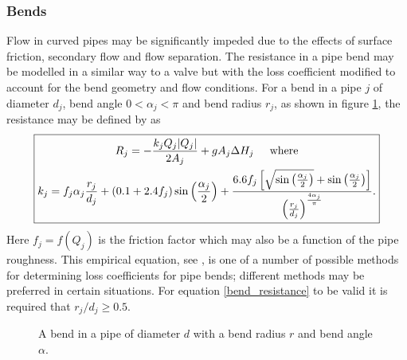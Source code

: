 \subsubsection{Bends} 

Flow in curved pipes may be significantly impeded due to the effects of surface friction, secondary flow and flow separation. The resistance in a pipe bend may be modelled in a similar way to a valve but with the loss coefficient modified to account for the bend geometry and flow conditions. For a bend in a pipe $j$ of diameter $d_j$, bend angle $0 < \alpha_j < \pi$ and bend radius $r_j$, as shown in figure \ref{fig:bend_diagram}, the resistance may be defined by as
\begin{align}\label{bend_resistance}
\boxed{
  \!\begin{gathered}
  R_j = - \frac{k_j Q_j|Q_j| }{2 A_j} + g A_j \Delta H_j \hspace{0.5cm} \text{where}\\
  k_j = f_j \alpha_j \frac{r_j}{d_j}	 + (0.1 + 2.4 f_j) \sin \left( \frac{\alpha_j}{2} \right) + \frac{6.6 f_j \left[ \sqrt{\sin \left( \frac{\alpha_j}{2} \right) } + \sin \left( \frac{\alpha_j}{2} \right)  \right] }{\left(\frac{r_j}{d_j} \right)^{\frac{4 \alpha_j}{\pi}}}.
  \end{gathered}
}
\end{align}
Here $f_j = f(Q_j)$ is the friction factor which may also be a function of the pipe roughness. This empirical equation, see \cite{rennels22}, is one of a number of possible methods for determining loss coefficients for pipe bends; different methods may be preferred in certain situations. For equation \eqref{bend_resistance} to be valid it is required that $r_j / d_j \geq 0.5$.


\begin{figure}
\centering
{} 
\caption{A bend in a pipe of diameter $d$ with a bend radius $r$ and bend angle $\alpha$.}
\label{fig:bend_diagram}
\end{figure}